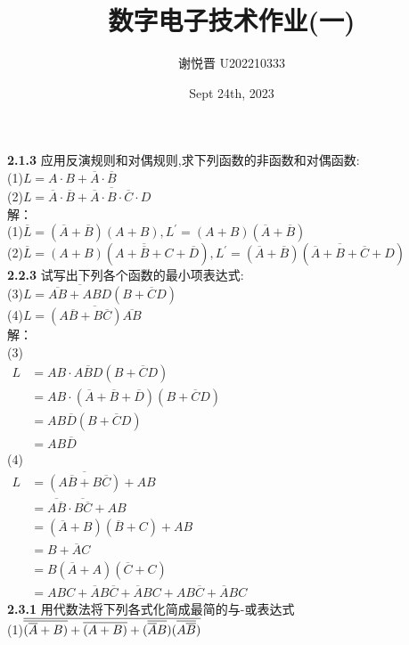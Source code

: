 \documentclass[a4paper,11pt,UTF8]{article}
\title{数字电子技术作业(一)}
\author{谢悦晋 \quad U202210333}
\date{Sept 24th, 2023 }
\begin{document}
\maketitle
\noindent\textbf{2.1.3} 应用反演规则和对偶规则,求下列函数的非函数和对偶函数:\\
(1)$L=A\cdot B+\overline{A}\cdot\overline{B}$\\
(2)$L=\overline{A}\cdot\overline{B}+\overline{\overline{A}\cdot B\cdot\overline{C}}\cdot D$\\
解：\\
(1)$\overline{L}=(\overline{A}+\overline{B})(A+B), L^\prime=(A+B)(\overline{A}+\overline{B})$\\
(2)$\overline{L}=(A+B)(\overline{A+\overline{B}+C}+\overline{D}), L^\prime=(\overline{A}+\overline{B})(\overline{\overline{A}+B+\overline{C}}+D)$\\
\textbf{2.2.3} 试写出下列各个函数的最小项表达式:\\
(3)$L=\overline{\overline{AB}+ABD}(B+\overline{C}D)$\\
(4)$L=\overline{(A\overline{B}+B\overline{C})\overline{AB}}$\\
解：\\
(3)\\$\begin{aligned}
	L&=AB\cdot\overline{ABD}(B+\overline{C}D)\\
	&=AB\cdot(\overline{A}+\overline{B}+\overline{D})(B+\overline{C}D)\\
	&=AB\overline{D}(B+\overline{C}D)\\
	&=AB\overline{D}
\end{aligned}$\\
(4)\\$\begin{aligned}
	L&=\overline{(A\overline{B}+B\overline{C})}+AB\\
	&=\overline{A\overline{B}}\cdot\overline{B\overline{C}}+AB\\
	&=(\overline{A}+B)(\overline{B}+C)+AB\\
	&=B+\overline{A}C\\
	&=B(\overline{A}+A)(\overline{C}+C)\\
	&=ABC+\overline{A}B\overline{C}+\overline{A}BC+AB\overline{C}+\overline{A}BC
\end{aligned}$\\
\textbf{2.3.1}
用代数法将下列各式化简成最简的与-或表达式\\
(1)$\overline{\overline{(\overline{A}+B)}+\overline{(A+B)}+(\overline{\overline{A}B})(\overline{A\overline{B}})}\\$
\end{document}
